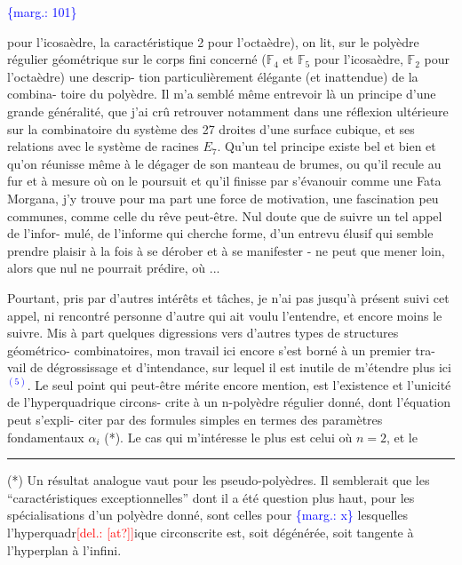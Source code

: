 \documentclass[11pt]{article}
\newcommand{\scanpage}[1]{\par\bigskip\noindent{\small\sffamily[scan #1]}\par}
\newcommand{\mspage}[1]{{\small\sffamily[p.\,#1]}}
\newcommand{\hand}[1]{\textcolor{blue}{#1}}
\newcommand{\margin}[1]{\textcolor{blue}{\{\textsf{marg.:} #1\}}}
\newcommand{\deleted}[1]{\textcolor{red}{[\textsf{del.:} #1]}}
\newcommand{\unsure}[1]{[#1?]}
\begin{document}
\margin{101}

\clearpage
\scanpage{119/102}
\mspage{24}

pour l'icosaèdre, la caractéristique 2 pour l'octaèdre), on lit,
sur le polyèdre régulier géométrique sur le corps fini concerné
($\mathbb{F}_4$ et $\mathbb{F}_5$ pour l'icosaèdre, $\mathbb{F}_2$ pour l'octaèdre) une descrip-%
tion particulièrement élégante (et inattendue) de la combina-%
toire du polyèdre. Il m'a semblé même entrevoir là un principe
d'une grande généralité, que j'ai crû retrouver notamment dans
une réflexion ultérieure sur la combinatoire du système des 27
droites d'une surface cubique, et ses relations avec le système
de racines $E_7$. Qu'un tel principe existe bel et bien et qu'on
réunisse même à le dégager de son manteau de brumes, ou qu'il
recule au fur et à mesure où on le poursuit et qu'il finisse par
s'évanouir comme une Fata Morgana, j'y trouve pour ma part une
force de motivation, une fascination peu communes, comme celle du
rêve peut-être. Nul doute que de suivre un tel appel de l'infor-%
mulé, de l'informe qui cherche forme, d'un entrevu
élusif qui semble prendre plaisir à la fois à se dérober et à se
manifester - ne peut que mener loin, alors que nul ne pourrait
prédire, où ...

Pourtant, pris par d'autres intérêts et tâches, je n'ai
pas jusqu'à présent suivi cet appel, ni rencontré personne d'autre
qui ait voulu l'entendre, et encore moins le suivre. Mis à part
quelques digressions vers d'autres types de structures géométrico-
combinatoires, mon travail ici encore s'est borné à un premier tra-%
vail de dégrossissage et d'intendance, sur lequel il est inutile
de m'étendre plus ici\hand{$^{(5)}$}. Le seul point qui peut-être mérite encore
mention, est l'existence et l'unicité de l'hyperquadrique circons-%
crite à un n-polyèdre régulier donné, dont l'équation peut s'expli-%
citer par des formules simples en termes des paramètres fondamentaux
$\alpha_i$ (*). Le cas qui m'intéresse le plus est celui où $n = 2$, et le

\rule{5cm}{0.4pt}

(*) Un résultat analogue vaut pour les pseudo-polyèdres. Il semblerait
que les ``caractéristiques exceptionnelles'' dont il a été question plus
haut, pour les spécialisations d'un polyèdre donné, sont celles pour
\margin{x} lesquelles l'hyperquadr\deleted{\unsure{at}}ique circonscrite est, soit dégénérée, soit
tangente à l'hyperplan à l'infini.
\end{document}
